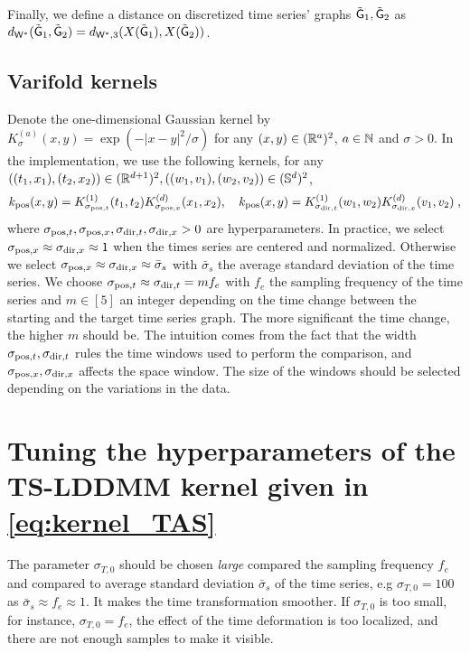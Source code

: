  Finally, we define a distance on discretized time series' graphs $\tilde{\mathsf{G}}_1,\tilde{\mathsf{G}}_2$ as $d_{\mathsf{W}^*}(\tilde{\mathsf{G}}_1,\tilde{\mathsf{G}}_2)=d_{\mathsf{W}^*,3}(X(\tilde{\mathsf{G}}_1),X(\tilde{\mathsf{G}}_2)) $.


\subsection{Varifold kernels}
\label{appendix:kernel_implementation}
Denote the one-dimensional Gaussian kernel by $K_\sigma^{(a)}(x,y)=\exp(-|x-y|^2/\sigma)$ for any $(x,y)\in (\mathbb{R}^a)^2$, $a\in \mathbb{N}$ and $\sigma>0$.
In the implementation, we use the following kernels, for any $((t_1,x_1),(t_2,x_2))\in (\mathbb{R}^{d+1})^2, ((w_1,v_1),(w_2,v_2))\in (\mathbb{S}^{d})^2 $,
\begin{equation}
  k_{\mathrm{pos}}(x,y)=K_{\sigma_{\mathrm{pos},t}}^{(1)}(t_1,t_2)K_{\sigma_{\mathrm{pos},x}}^{(d)}(x_1,x_2),\quad k_{\mathrm{pos}}(x,y)=K_{\sigma_{\mathrm{dir},t}}^{(1)}(w_1,w_2)K_{\sigma_{\mathrm{dir},x}}^{(d)}(v_1,v_2)\; ,
\end{equation}
where $\sigma_{\mathrm{pos},t}, \sigma_{\mathrm{pos},x}, \sigma_{\mathrm{dir},t}, \sigma_{\mathrm{dir},x}>0 $ are hyperparameters.
 In practice, we select $\sigma_{\mathrm{pos},x}\approx \sigma_{\mathrm{dir},x} \approx 1$ when the times series are centered and normalized. Otherwise we select $\sigma_{\mathrm{pos},x}\approx \sigma_{\mathrm{dir},x} \approx \bar{\sigma}_{s}$ with $\bar{\sigma}_{s}$ the average standard deviation of the time series.
  We choose $\sigma_{\mathrm{pos},t}\approx \sigma_{\mathrm{dir},t} = m f_e$ with $f_e$ the sampling frequency of the time series and $m\in [5]$ an integer depending on the time change between the starting and the target time series graph.
  The more significant the time change, the higher $m$ should be. The intuition comes from the fact that the width $\sigma_{\mathrm{pos},t}, \sigma_{\mathrm{dir},t}$ rules the time windows used to perform the comparison, and $\sigma_{\mathrm{pos},x}, \sigma_{\mathrm{dir},x}$ affects the space window.
   The size of the windows should be selected depending on the variations in the data.

\section{Tuning the hyperparameters of the TS-LDDMM kernel given in \eqref{eq:kernel_TAS}}
\label{appendix:kernel_TS_LDDMM}
The parameter $\sigma_{T,0}$ should be chosen \textit{large} compared the sampling frequency $f_e$ and compared to average standard deviation $\bar{\sigma}_s$ of the time series, e.g $\sigma_{T,0}=100$ as $\bar{\sigma}_s\approx f_e\approx  1 $.
It makes the time transformation smoother. If $\sigma_{T,0}$ is too small, for instance, $\sigma_{T,0}=f_e $, the effect of the time deformation is too localized, and there are not enough samples to make it visible.

